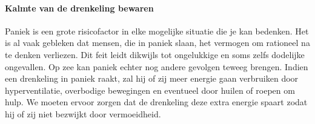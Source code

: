 \paragraph{Kalmte van de drenkeling bewaren}

Paniek is een grote risicofactor in elke mogelijke situatie die je kan bedenken. Het is al vaak gebleken dat mensen, die in paniek slaan, het vermogen om rationeel na te denken verliezen. Dit feit leidt dikwijls tot ongelukkige en soms zelfs dodelijke ongevallen. Op zee kan paniek echter nog andere gevolgen teweeg brengen. Indien een drenkeling in paniek raakt, zal hij of zij meer energie gaan verbruiken door hyperventilatie, overbodige bewegingen en eventueel door huilen of roepen om hulp. We moeten ervoor zorgen dat de drenkeling deze extra energie spaart zodat hij of zij niet bezwijkt door vermoeidheid.